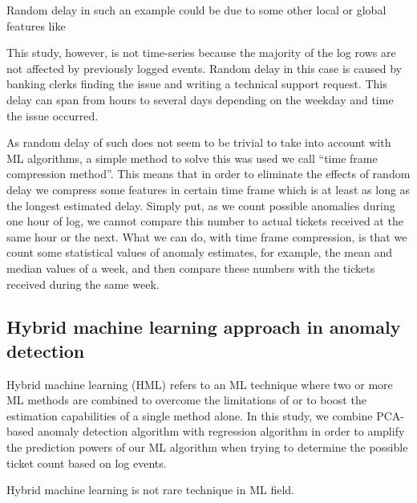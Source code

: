 Random delay in such an example
could be due to some other local or global features
like

This study, however,
is not time-series
because the majority of the log rows
are not affected by previously logged events.
Random delay in this case
is caused by banking clerks
finding the issue and writing a technical support request.
This delay can span from hours to several days
depending on the weekday and time the issue occurred.


As random delay of such
does not  seem to be trivial to take into account
with ML algorithms, %
a simple method to solve this was used
we call \enquote{time frame compression method}.
This means that
in order to eliminate the effects of random delay
we compress some features in certain time frame
which is at least as long as the longest estimated delay.
Simply put,
as we count possible anomalies during one hour of log,
we cannot compare this number to actual tickets received
at the same hour or the next.
What we can do,
with time frame compression,
is that we count some statistical values of anomaly estimates,
for example, the mean and median values of a week,
and then compare these numbers with the tickets received
during the same week.




\subsection{Hybrid machine learning approach in anomaly detection}\label{subsec:bg-hybrid-ml-approach-with-anomaly-detection}

Hybrid machine learning (HML)
refers to an ML technique
where two or more ML methods are combined
to overcome the limitations of
or to boost the estimation capabilities of
a single method alone.\cite{Anifowose2020hml}
In this study,
we combine PCA-based anomaly detection algorithm
with regression algorithm
in order to amplify the prediction powers of our ML algorithm
when trying to determine the possible ticket count
based on log events.

Hybrid machine learning is not rare technique in ML field.\cite{shon2007hybrid,tsai2010credit,mohan2019effective,
    hsieh2005hybrid,jain2007hybrid,kim2007hybrid,lee2002credit,malhotra2002differentiating}

